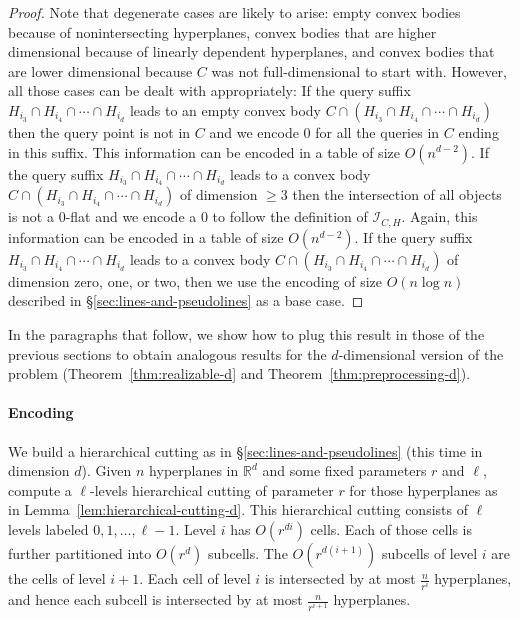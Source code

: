\begin{proof}
  Note that degenerate cases are likely to arise:
  empty convex bodies because of nonintersecting hyperplanes, convex
  bodies that are higher dimensional because of linearly dependent hyperplanes,
  and convex bodies that are lower dimensional because \(C\) was not
  full-dimensional to start with.
  However, all those cases can be dealt with appropriately:
  If the query suffix
  \(H_{i_3} \cap H_{i_4} \cap \cdots \cap H_{i_d}\)
  leads to an empty convex body
  \(C \cap (H_{i_3} \cap H_{i_4} \cap \cdots \cap H_{i_d})\)
  then the query point is not in \(C\) and we encode
  \(0\) for all the queries in \(C\) ending in this suffix.
  This information can be encoded in a table of size \(O(n^{d-2})\).
  If the query suffix
  \(H_{i_3} \cap H_{i_4} \cap \cdots \cap H_{i_d}\)
  leads to a convex body
  \(C \cap (H_{i_3} \cap H_{i_4} \cap \cdots \cap H_{i_d})\)
  of dimension \(\geq 3\) then the intersection of all objects
  is not a \(0\)-flat and we encode a \(0\) to follow the definition
  of \(\mathcal{I}_{C,H}\).
  Again, this information can be encoded in a table of size \(O(n^{d-2})\).
  If the query suffix
  \(H_{i_3} \cap H_{i_4} \cap \cdots \cap H_{i_d}\)
  leads to a convex body
  \(C \cap (H_{i_3} \cap H_{i_4} \cap \cdots \cap H_{i_d})\)
  of dimension zero, one, or two,
  then we use the encoding of size \(O(n \log n)\) described in
  \S\ref{sec:lines-and-pseudolines} as a base case.
\end{proof}


In the paragraphs that follow, we show how to plug this result in those of
the previous sections to obtain analogous results for the \(d\)-dimensional
version of the problem (Theorem~\ref{thm:realizable-d} and
Theorem~\ref{thm:preprocessing-d}).

\paragraph*{Encoding}
We build a hierarchical cutting as in
\S\ref{sec:lines-and-pseudolines} (this time in dimension
\(d\)).
%
Given \(n\) hyperplanes in \(\mathbb{R}^d\) and some fixed
parameters \(r\) and \(\ell\), compute a \(\ell\)-levels hierarchical cutting
of parameter \(r\) for those
hyperplanes as in Lemma~\ref{lem:hierarchical-cutting-d}.
This hierarchical cutting consists of \( \ell \) levels
labeled \(0,1,\ldots,\ell-1\). Level \(i\) has \(O(r^{di})\)
cells. Each of those cells is further partitioned into
\(O(r^d)\) subcells. The \(O(r^{d(i+1)})\) subcells of level \(i\)
are the cells of level \(i+1\). Each cell of level \(i\) is intersected by at
most \(\frac{n}{r^i}\) hyperplanes, and hence each subcell is intersected by at
most \(\frac{n}{r^{i+1}}\) hyperplanes.

